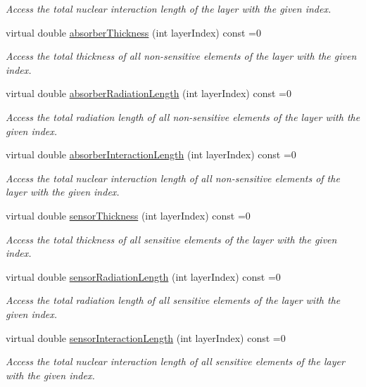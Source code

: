 \begin{DoxyCompactItemize}
\begin{DoxyCompactList}\small\item\em Access the total nuclear interaction length of the layer with the given index. \end{DoxyCompactList}\item 
virtual double \hyperlink{class_d_d4hep_1_1_d_d_rec_1_1_layering_extension_ab4c19a0eccfd5cffc6816fa3b0ec9fb7}{absorber\+Thickness} (int layer\+Index) const =0
\begin{DoxyCompactList}\small\item\em Access the total thickness of all non-\/sensitive elements of the layer with the given index. \end{DoxyCompactList}\item 
virtual double \hyperlink{class_d_d4hep_1_1_d_d_rec_1_1_layering_extension_aca33441136624022aa7414895ba81fef}{absorber\+Radiation\+Length} (int layer\+Index) const =0
\begin{DoxyCompactList}\small\item\em Access the total radiation length of all non-\/sensitive elements of the layer with the given index. \end{DoxyCompactList}\item 
virtual double \hyperlink{class_d_d4hep_1_1_d_d_rec_1_1_layering_extension_af18b1293c0631bd55798e7c73eddeb6b}{absorber\+Interaction\+Length} (int layer\+Index) const =0
\begin{DoxyCompactList}\small\item\em Access the total nuclear interaction length of all non-\/sensitive elements of the layer with the given index. \end{DoxyCompactList}\item 
virtual double \hyperlink{class_d_d4hep_1_1_d_d_rec_1_1_layering_extension_a06a960f9de84690eb3383f89d1aada13}{sensor\+Thickness} (int layer\+Index) const =0
\begin{DoxyCompactList}\small\item\em Access the total thickness of all sensitive elements of the layer with the given index. \end{DoxyCompactList}\item 
virtual double \hyperlink{class_d_d4hep_1_1_d_d_rec_1_1_layering_extension_a1328587b943abe82353de131d9fac071}{sensor\+Radiation\+Length} (int layer\+Index) const =0
\begin{DoxyCompactList}\small\item\em Access the total radiation length of all sensitive elements of the layer with the given index. \end{DoxyCompactList}\item 
virtual double \hyperlink{class_d_d4hep_1_1_d_d_rec_1_1_layering_extension_a99d3faa45e42d0a34635ea7f3ac2c038}{sensor\+Interaction\+Length} (int layer\+Index) const =0
\begin{DoxyCompactList}\small\item\em Access the total nuclear interaction length of all sensitive elements of the layer with the given index. \end{DoxyCompactList}\end{DoxyCompactItemize}
